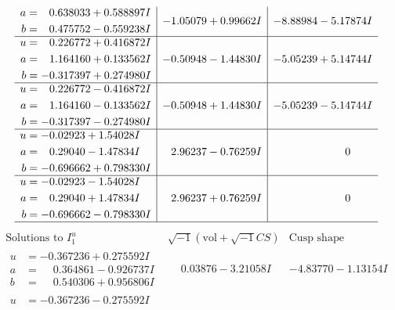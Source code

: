 \documentclass[1p]{elsarticle_modified}
\theoremstyle{definition}
\newcommand{\I}{\sqrt{-1}}
\begin{document}
$$\begin{array}{c|c|c}
\begin{aligned}
a &= \phantom{-}0.638033 + 0.588897 I \\
b &= \phantom{-}0.475752 - 0.559238 I\end{aligned}
 & -1.05079 + 0.99662 I & -8.88984 - 5.17874 I \\ \hline\begin{aligned}
u &= \phantom{-}0.226772 + 0.416872 I \\
a &= \phantom{-}1.164160 + 0.133562 I \\
b &= -0.317397 + 0.274980 I\end{aligned}
 & -0.50948 - 1.44830 I & -5.05239 + 5.14744 I \\ \hline\begin{aligned}
u &= \phantom{-}0.226772 - 0.416872 I \\
a &= \phantom{-}1.164160 - 0.133562 I \\
b &= -0.317397 - 0.274980 I\end{aligned}
 & -0.50948 + 1.44830 I & -5.05239 - 5.14744 I \\ \hline\begin{aligned}
u &= -0.02923 + 1.54028 I \\
a &= \phantom{-}0.29040 - 1.47834 I \\
b &= -0.696662 + 0.798330 I\end{aligned}
 & \phantom{-}2.96237 - 0.76259 I & \phantom{-0.000000 } 0 \\ \hline\begin{aligned}
u &= -0.02923 - 1.54028 I \\
a &= \phantom{-}0.29040 + 1.47834 I \\
b &= -0.696662 - 0.798330 I\end{aligned}
 & \phantom{-}2.96237 + 0.76259 I & \phantom{-0.000000 } 0\\
 \hline 
 \end{array}$$\newpage$$\begin{array}{c|c|c}  
\text{Solutions to }I^u_{1}& \I (\text{vol} + \sqrt{-1}CS) & \text{Cusp shape}\\
 \hline 
\begin{aligned}
u &= -0.367236 + 0.275592 I \\
a &= \phantom{-}0.364861 - 0.926737 I \\
b &= \phantom{-}0.540306 + 0.956806 I\end{aligned}
 & \phantom{-}0.03876 - 3.21058 I & -4.83770 - 1.13154 I \\ \hline\begin{aligned}
u &= -0.367236 - 0.275592 I \\

\end{aligned}
\end{array}$$
\end{document}

